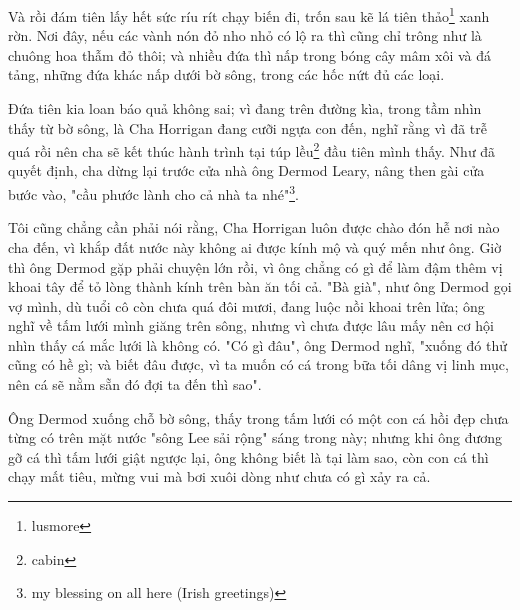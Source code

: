 Và rồi đám tiên lấy hết sức ríu rít chạy biến đi, trốn sau kẽ lá tiên thảo\footnote{lusmore} xanh rờn. Nơi đây, nếu các vành nón đỏ nho nhỏ có lộ ra thì cũng chỉ trông như là chuông hoa thẫm đỏ thôi; và nhiều đứa thì nấp trong bóng cây mâm xôi và đá tảng, những đứa khác nấp dưới bờ sông, trong các hốc nứt đủ các loại.

Đứa tiên kia loan báo quả không sai; vì đang trên đường kìa, trong tầm nhìn thấy từ bờ sông, là Cha Horrigan đang cưỡi ngựa con đến, nghĩ rằng vì đã trễ quá rồi nên cha sẽ kết thúc hành trình tại túp lều\footnote{cabin} đầu tiên mình thấy. Như đã quyết định, cha dừng lại trước cửa nhà ông Dermod Leary, nâng then gài cửa bước vào, "cầu phước lành cho cả nhà ta nhé"\footnote{my blessing on all here (Irish greetings)}.

Tôi cũng chẳng cần phải nói rằng, Cha Horrigan luôn được chào đón hễ nơi nào cha đến, vì khắp đất nước này không ai được kính mộ và quý mến như ông. Giờ thì ông Dermod gặp phải chuyện lớn rồi, vì ông chẳng có gì để làm đậm thêm vị khoai tây để tỏ lòng thành kính trên bàn ăn tối cả. "Bà già", như ông Dermod gọi vợ mình, dù tuổi cô còn chưa quá đôi mươi, đang luộc nồi khoai trên lửa; ông nghĩ về tấm lưới mình giăng trên sông, nhưng vì chưa được lâu mấy nên cơ hội nhìn thấy cá mắc lưới là không có. "Có gì đâu", ông Dermod nghĩ, "xuống đó thử cũng có hề gì; và biết đâu được, vì ta muốn có cá trong bữa tối dâng vị linh mục, nên cá sẽ nằm sẵn đó đợi ta đến thì sao".

Ông Dermod xuống chỗ bờ sông, thấy trong tấm lưới có một con cá hồi đẹp chưa từng có trên mặt nước "sông Lee sải rộng" sáng trong này; nhưng khi ông đương gỡ cá thì tấm lưới giật ngược lại, ông không biết là tại làm sao, còn con cá thì chạy mất tiêu, mừng vui mà bơi xuôi dòng như chưa có gì xảy ra cả.

